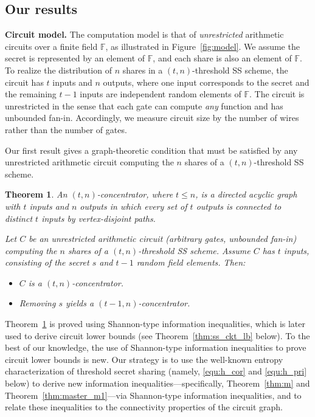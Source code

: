 \documentclass[11pt]{article}
\newtheorem{theorem}{Theorem}
\begin{document}
\subsection{Our results}

\textbf{Circuit model.} The computation model is that of \emph{unrestricted} arithmetic circuits over a finite field $\mathbb{F}$, as illustrated in Figure~\ref{fig:model}. We assume the secret is represented by an element of $\mathbb{F}$, and each share is also an element of $\mathbb{F}$. To realize the distribution of $n$ shares in a $(t,n)$-threshold SS scheme, the circuit has $t$ inputs and $n$ outputs, where one input corresponds to the secret and the remaining $t-1$ inputs are independent random elements of $\mathbb{F}$. The circuit is unrestricted in the sense that each gate can compute \emph{any} function and has unbounded fan-in. Accordingly, we measure circuit size by the number of wires rather than the number of gates.

Our first result gives a graph-theoretic condition that must be satisfied by any unrestricted arithmetic circuit computing the $n$ shares of a $(t,n)$-threshold SS scheme.

\begin{theorem}
\label{thm:main_condition}
An \emph{$(t, n)$-concentrator}, where $t \le n$, is a directed acyclic graph with $t$ inputs and $n$ outputs in which every set of $t$ outputs is connected to distinct $t$ inputs by vertex-disjoint paths.

Let $C$ be an unrestricted arithmetic circuit (arbitrary gates, unbounded fan-in) computing the $n$ shares of a $(t,n)$-threshold SS scheme. Assume $C$ has $t$ inputs, consisting of the secret $s$ and $t-1$ random field elements. Then:
\begin{itemize}
    \item $C$ is a $(t,n)$-concentrator.
    \item Removing $s$ yields a $(t-1,n)$-concentrator.
\end{itemize}
\end{theorem}

Theorem~\ref{thm:main_condition} is proved using Shannon-type information inequalities, which is later used to derive circuit lower bounds (see Theorem~\ref{thm:ss_ckt_lb} below). To the best of our knowledge, the use of Shannon-type information inequalities to prove circuit lower bounds is new.  
Our strategy is to use the well-known entropy characterization of threshold
secret sharing (namely, \eqref{equ:h_cor} and \eqref{equ:h_pri} below) to derive new
information inequalities—specifically, Theorem~\ref{thm:m} and
Theorem~\ref{thm:master_m1}—via Shannon-type information inequalities, and to
relate these inequalities to the connectivity properties of the circuit graph.
\end{document}

